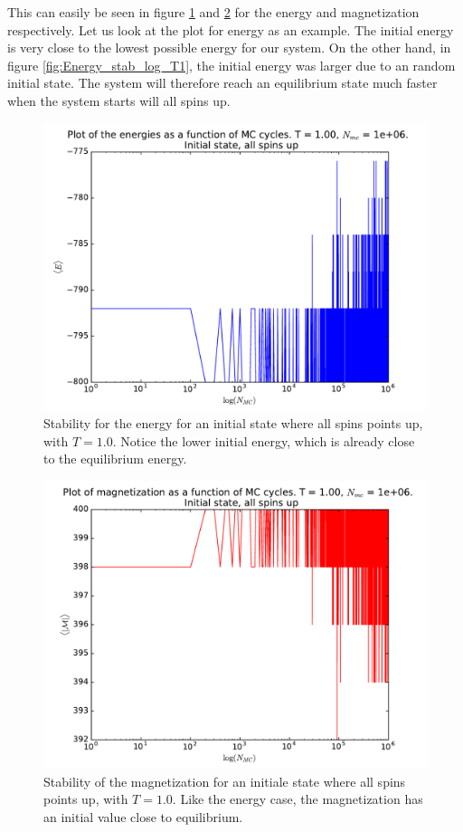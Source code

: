 \documentclass[12pt]{article}
\begin{document}
This can easily be seen in figure \ref{fig:Energy_stab_log_T1_SpinUp} and \ref{fig:Mag_stab_log_T1_SpinUp} for the energy and magnetization respectively. Let us look at the plot for energy as an example. The initial energy is very close to the lowest possible energy for our system. On the other hand, in figure \ref{fig:Energy_stab_log_T1}, the initial energy was larger due to an random initial state. The system will therefore reach an equilibrium state much faster when the system starts will all spins up.
\begin{figure}[H]
\centering
\includegraphics[width=\linewidth]{Plots/Energy_stability_UpInitSpin_logarithmic_T1.pdf}
\caption{Stability for the energy for an initial state where all spins points up, with $T=1.0$. Notice the lower initial energy, which is already close to the equilibrium energy.}
\label{fig:Energy_stab_log_T1_SpinUp}
\end{figure}
\begin{figure}[H]
\centering
\includegraphics[width=\linewidth]{Plots/Magnetization_stability_UpInitSpin_logarithmic_T1.pdf}
\caption{Stability of the magnetization for an initiale state where all spins points up, with $T=1.0$. Like the energy case, the magnetization has an initial value close to equilibrium.}
\label{fig:Mag_stab_log_T1_SpinUp}
\end{figure}
\end{document}
